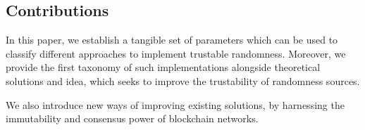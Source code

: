 \subsection*{Contributions}\label{subsec:contributions}
In this paper, we establish a tangible set of parameters which can be used to classify different approaches to implement trustable randomness.
Moreover, we provide the first taxonomy of such implementations alongside theoretical solutions and idea, which seeks to improve the trustability of randomness sources.

We also introduce new ways of improving existing solutions, by harnessing the immutability and consensus power of blockchain networks.







